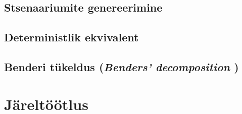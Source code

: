 \documentclass[10pt,a4paper]{article}
\begin{document}
\subsection{Stsenaariumite genereerimine}
\label{sec:stoch_gen}
\subsection{Deterministlik ekvivalent}
\label{sec:stoch_det}
\subsection{Benderi tükeldus (\emph{Benders' decomposition} ) }
\label{sec:stoch_bender}

\section{Järeltöötlus}
\label{sec:jareltootlus}
%
\end{document}

